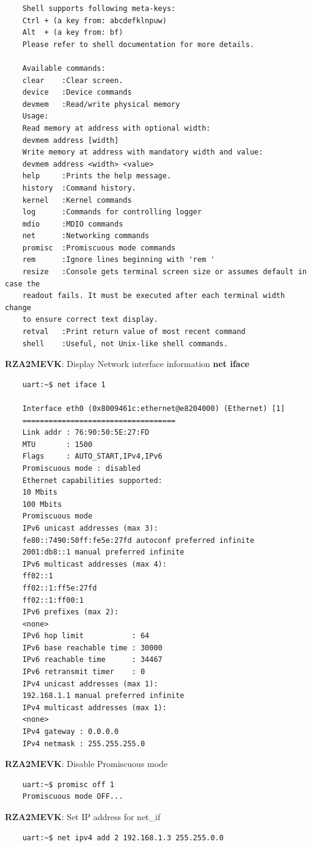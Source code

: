 \documentclass[11pt,a4paper,oneside]{article}
\begin{document}
\begin{lstlisting}
	Shell supports following meta-keys:
	Ctrl + (a key from: abcdefklnpuw)
	Alt  + (a key from: bf)
	Please refer to shell documentation for more details.

	Available commands:
	clear    :Clear screen.
	device   :Device commands
	devmem   :Read/write physical memory
	Usage:
	Read memory at address with optional width:
	devmem address [width]
	Write memory at address with mandatory width and value:
	devmem address <width> <value>
	help     :Prints the help message.
	history  :Command history.
	kernel   :Kernel commands
	log      :Commands for controlling logger
	mdio     :MDIO commands
	net      :Networking commands
	promisc  :Promiscuous mode commands
	rem      :Ignore lines beginning with 'rem '
	resize   :Console gets terminal screen size or assumes default in case the
	readout fails. It must be executed after each terminal width change
	to ensure correct text display.
	retval   :Print return value of most recent command
	shell    :Useful, not Unix-like shell commands.
\end{lstlisting}

\textbf{RZA2MEVK}: Display Network interface information \textbf{net iface}
\begin{lstlisting}
	uart:~$ net iface 1

	Interface eth0 (0x8009461c:ethernet@e8204000) (Ethernet) [1]
	===================================
	Link addr : 76:90:50:5E:27:FD
	MTU       : 1500
	Flags     : AUTO_START,IPv4,IPv6
	Promiscuous mode : disabled
	Ethernet capabilities supported:
	10 Mbits
	100 Mbits
	Promiscuous mode
	IPv6 unicast addresses (max 3):
	fe80::7490:50ff:fe5e:27fd autoconf preferred infinite
	2001:db8::1 manual preferred infinite
	IPv6 multicast addresses (max 4):
	ff02::1
	ff02::1:ff5e:27fd
	ff02::1:ff00:1
	IPv6 prefixes (max 2):
	<none>
	IPv6 hop limit           : 64
	IPv6 base reachable time : 30000
	IPv6 reachable time      : 34467
	IPv6 retransmit timer    : 0
	IPv4 unicast addresses (max 1):
	192.168.1.1 manual preferred infinite
	IPv4 multicast addresses (max 1):
	<none>
	IPv4 gateway : 0.0.0.0
	IPv4 netmask : 255.255.255.0
\end{lstlisting}

\textbf{RZA2MEVK}: Disable Promiscuous mode
\begin{lstlisting}
	uart:~$ promisc off 1
	Promiscuous mode OFF...
\end{lstlisting}

\textbf{RZA2MEVK}: Set IP address for net\_if
\begin{lstlisting}
	uart:~$ net ipv4 add 2 192.168.1.3 255.255.0.0
\end{lstlisting}
\end{document}
